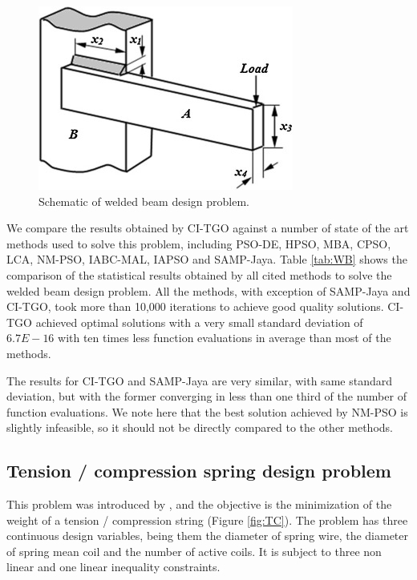 \begin{figure}[h]
\begin{center}
\includegraphics[scale=0.7]{Imgs/WB.jpg}
\end{center}
\captionsetup{justification=centering}
\caption{Schematic of welded beam design problem.}\label{fig:WB}
\end{figure}

We compare the results obtained by CI-TGO against a number of state of the art methods used to solve this problem, including PSO-DE, HPSO, MBA, CPSO, LCA, NM-PSO, IABC-MAL, IAPSO and SAMP-Jaya. Table \ref{tab:WB} shows the comparison of the statistical results obtained by all cited methods to solve the welded beam design problem. All the methods, with exception of SAMP-Jaya and CI-TGO, took more than 10,000 iterations to achieve good quality solutions. CI-TGO achieved optimal solutions with a very small standard deviation of $6.7E \!-\! 16$ with ten times less function evaluations in average than most of the methods.



The results for CI-TGO and SAMP-Jaya are very similar, with same standard deviation, but with the former converging in less than one third of the number of function evaluations. We note here that the best solution achieved by NM-PSO is slightly infeasible, so it should not be directly compared to the other methods.




\subsection{Tension / compression spring design problem}

This problem was introduced by \cite{TC}, and the objective is the minimization of the weight of a tension / compression string (Figure \ref{fig:TC}). The problem has three continuous design variables, being them the diameter of spring wire, the diameter of spring mean coil and the number of active coils. It is subject to three non linear and one linear inequality constraints.

